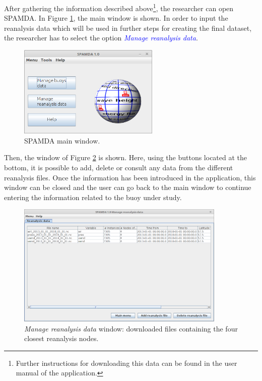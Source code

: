 \documentclass[energies,article,submit,moreauthors,pdftex]{Definitions/mdpi}
\begin{document}
			After gathering the information described above\footnote{Further instructions for downloading this data can be found in the user manual of the application.}, the researcher can open SPAMDA. In Figure \ref{fig:main_view}, the main window is shown. In order to input the reanalysis data which will be used in further steps for creating the final dataset, the researcher has to select the option \textcolor{blue}{\textit{Manage reanalysis data}}.
		
			\begin{figure}[ht]
				\centering
				\includegraphics[width=0.60\textwidth]{figures/FigureMain_view.png}
				\caption{SPAMDA main window.}\label{fig:main_view}
			\end{figure}
			
			Then, the window of Figure \ref{fig:reanalysis} is shown. Here, using the buttons located at the bottom, it is possible to add, delete or consult any data from the different reanalysis files. Once the information has been introduced in the application, this window can be closed and the user can go back to the main window to continue entering the information related to the buoy under study. 
			
			\begin{figure}[ht!]
				\centering
				\includegraphics[width=0.89\textwidth]{figures/FigureManage_reanalysis_data.png}
				\caption{\textit{Manage reanalysis data} window: downloaded files containing the four closest reanalysis nodes.}\label{fig:reanalysis}
			\end{figure}
		
\end{document}
